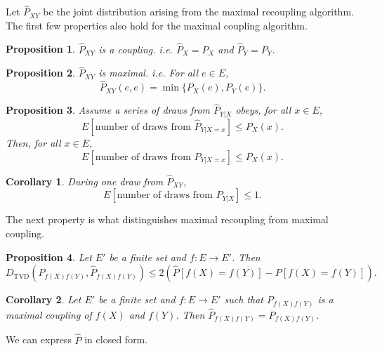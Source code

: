 \documentclass{article}
\newtheorem{proposition}{Proposition}
\newtheorem{corollary}{Corollary}
\begin{document}
Let \(\hat{P}_{XY}\) be the joint distribution arising from the maximal recoupling algorithm.
The first few properties also hold for the maximal coupling algorithm.

\begin{proposition}
    \(\hat{P}_{XY}\) is a coupling. i.e. $\hat{P}_X = P_X$ and $\hat{P}_Y = P_Y$.
\end{proposition}

\begin{proposition}
    \(\hat{P}_{XY}\) is maximal. i.e. For all \(e \in E\),
    \[
        \hat{P}_{XY}(e,e) = \min \{ P_X(e), P_Y(e) \}.
    \]
\end{proposition}

\begin{proposition}
    Assume a series of draws from $\hat{P}_{Y|X}$ obeys,
    for all $x \in E$,
    \[
        E[\text{number of draws from \(\hat{P}_{Y|X=x}\)}] \le P_X(x).
    \]
    Then, for all $x \in E$,
    \[
        E[\text{number of draws from \(P_{Y|X=x}\)}] \le P_X(x).
    \]
\end{proposition}

\begin{corollary}
    During one draw from $\hat{P}_{XY}$,
    \[
        E[\text{number of draws from \(P_{Y|X}\)}] \le 1.
    \]
\end{corollary}

The next property is what distinguishes maximal recoupling from maximal coupling.

\begin{proposition}
    Let $E'$ be a finite set and $f : E \to E'$. Then
    \[
    D_{\text{TVD}}(P_{f(X)f(Y)}, \hat{P}_{f(X)f(Y)})
    \le 2 \left(\hat{P}[f(X) = f(Y)] - P[f(X) = f(Y)]\right).
    \]
\end{proposition}

\begin{corollary}
    Let $E'$ be a finite set and $f : E \to E'$ such that
    $P_{f(X)f(Y)}$ is a maximal coupling of $f(X)$ and $f(Y)$.
    Then $\hat{P}_{f(X)f(Y)} = P_{f(X)f(Y)}$.
\end{corollary}

We can express $\hat{P}$ in closed form.
\end{document}
